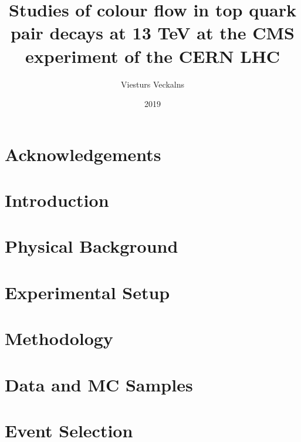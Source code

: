 \documentclass[titlepage, a4paper, EN, FULL]{mythesis}
\title{Studies of colour flow in top quark pair decays at 13 TeV at the CMS experiment of the CERN LHC}
\author{Viesturs Veckalns}
\date{2019}
\begin{document}
\maketitle
\begin{abstract}
        
\end{abstract}
\renewcommand{\abstractname}{Anotācija}

\begin{abstract}
        
\end{abstract}

\chapter*{Acknowledgements}
\label{chap:acknowledgements}


\tableofcontents
\listoffigures
\listoftables

\chapter{Introduction}
\label{chap:introduction}


\chapter{Physical Background}


\chapter{Experimental Setup}


\chapter{Methodology}
\label{chap:methodology}


\chapter{Data and MC Samples}
\label{chap:data_and_mc_samples}


\chapter{Event Selection}
\label{chap:event_selection}

\end{document}
